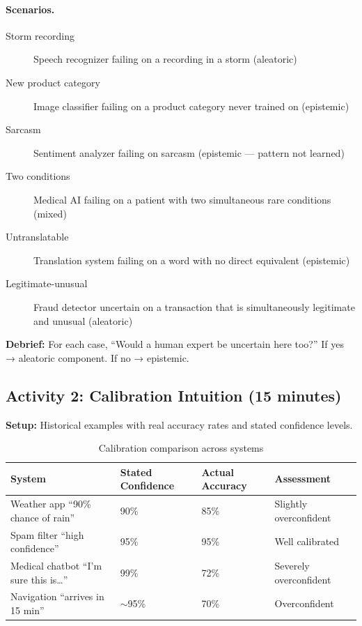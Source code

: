 \paragraph{Scenarios.}
\begin{description}
    \item[Storm recording] Speech recognizer failing on a recording in a storm (aleatoric)
    \item[New product category] Image classifier failing on a product category never trained on (epistemic)
    \item[Sarcasm] Sentiment analyzer failing on sarcasm (epistemic --- pattern not learned)
    \item[Two conditions] Medical AI failing on a patient with two simultaneous rare conditions (mixed)
    \item[Untranslatable] Translation system failing on a word with no direct equivalent (epistemic)
    \item[Legitimate-unusual] Fraud detector uncertain on a transaction that is simultaneously legitimate and unusual (aleatoric)
\end{description}

\textbf{Debrief:} For each case, ``Would a human expert be uncertain here too?'' If yes → aleatoric component. If no → epistemic.

\subsection{Activity 2: Calibration Intuition (15 minutes)}

\textbf{Setup:} Historical examples with real accuracy rates and stated confidence levels.

\begin{table}[htbp]
\caption{Calibration comparison across systems}
\label{tab:calibration-comparison}
\centering
\begin{tabular}{@{}p{4cm}p{3cm}p{3cm}p{3cm}@{}}
\toprule
\textbf{System} & \textbf{Stated Confidence} & \textbf{Actual Accuracy} & \textbf{Assessment} \\
\midrule
Weather app ``90\% chance of rain'' & 90\% & 85\% & Slightly overconfident \\
Spam filter ``high confidence'' & 95\% & 95\% & Well calibrated \\
Medical chatbot ``I'm sure this is\ldots'' & 99\% & 72\% & Severely overconfident \\
Navigation ``arrives in 15 min'' & $\sim$95\% & 70\% & Overconfident \\
\bottomrule
\end{tabular}
\end{table}

